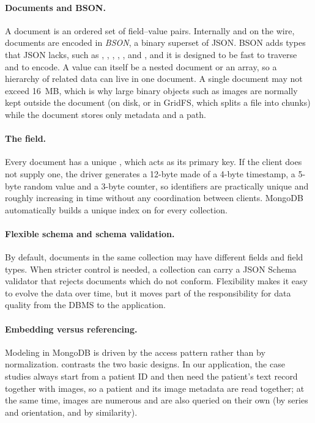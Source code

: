 \paragraph{Documents and BSON.}
A document is an ordered set of field--value pairs. Internally and on the wire, documents are
encoded in \emph{BSON}, a binary superset of JSON. BSON adds types that JSON lacks, such as
, , , , ,  and
, and it is designed to be fast to traverse and to encode. A value can itself be a
nested document or an array, so a hierarchy of related data can live in one document. A single
document may not exceed 16~MB, which is why large binary objects such as images are normally kept
outside the document (on disk, or in GridFS, which splits a file into chunks) while the document
stores only metadata and a path.

\paragraph{The  field.}
Every document has a unique , which acts as its primary key. If the client does not
supply one, the driver generates a 12-byte  made of a 4-byte timestamp, a 5-byte
random value and a 3-byte counter, so identifiers are practically unique and roughly increasing
in time without any coordination between clients. MongoDB automatically builds a unique index on
 for every collection.

\paragraph{Flexible schema and schema validation.}
By default, documents in the same collection may have different fields and field types. When
stricter control is needed, a collection can carry a JSON Schema validator that rejects documents
which do not conform. Flexibility makes it easy to evolve the data over time, but it moves part of
the responsibility for data quality from the DBMS to the application.

\paragraph{Embedding versus referencing.}
Modeling in MongoDB is driven by the access pattern rather than by normalization.
 contrasts the two basic designs. In our application, the case studies always
start from a patient ID and then need the patient's text record together with images, so a
patient and its image metadata are read together; at the same time, images are numerous and are
also queried on their own (by series and orientation, and by similarity). 

